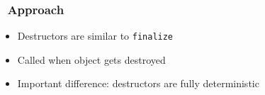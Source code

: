 \documentclass{../ucll-slides}
\begin{document}
\begin{frame}
  \frametitle{\cpp\ Approach}
  \begin{itemize}
    \item Destructors are similar to {\tt finalize}
    \item Called when object gets destroyed
    \item Important difference: destructors are fully deterministic
  \end{itemize}
  \vskip5mm
  \begin{overprint}


  \end{overprint}
\end{frame}

\end{document}

